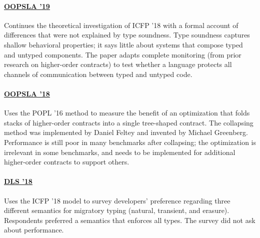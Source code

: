 \documentclass[10pt]{article}
\begin{document}
\paragraph{\href{https://www2.ccs.neu.edu/racket/pubs/oopsla19-gfd.pdf}{OOPSLA '19}}
Continues the theoretical investigation of ICFP '18 with a formal account of
differences that were not explained by type soundness.
Type soundness captures
shallow behavioral properties; it says little about systems that compose typed
and untyped components.
The paper adapts complete monitoring (from prior
research on higher-order contracts) to test whether a language protects all
channels of communication between typed and untyped code.


\paragraph{\href{https://www2.ccs.neu.edu/racket/pubs/oopsla18-fgsfs.pdf}{OOPSLA '18}}
Uses the POPL '16 method to measure the benefit of an optimization that folds
stacks of higher-order contracts into a single tree-shaped contract.
The collapsing method was implemented by Daniel Feltey and invented by
Michael Greenberg.
Performance is still poor in many benchmarks after collapsing; the
optimization is irrelevant in some benchmarks, and needs to be implemented for
additional higher-order contracts to support others.


\paragraph{\href{https://www2.ccs.neu.edu/racket/pubs/dls18-bg.pdf}{DLS '18}}
Uses the ICFP '18 model to survey developers' preference regarding three
different semantics for migratory typing (natural, transient, and erasure).
Respondents preferred a semantics that enforces all types.
The survey did not ask about performance.
\end{document}
